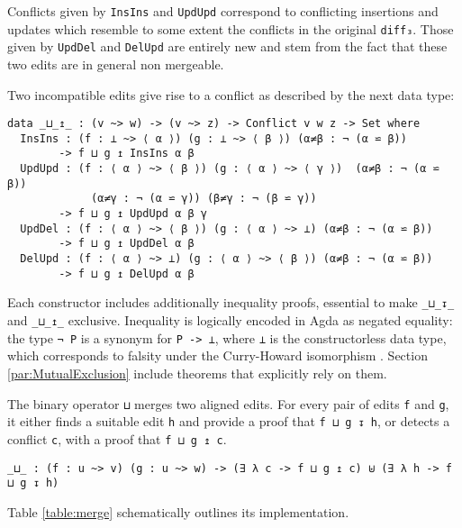 \documentclass[../Thesis.tex]{subfiles}
\begin{document}
	Conflicts given by \texttt{InsIns} and \texttt{UpdUpd}	 correspond to 
	conflicting insertions and updates which resemble to some extent the
	conflicts in the original \texttt{diff₃}. Those given by \texttt{UpdDel} and 
	\texttt{DelUpd} are entirely new and stem from the fact that these two
	edits are in general non mergeable.
	
	Two incompatible edits give rise to a conflict as described by the
	next data type:
	
\begin{verbatim}
data _⊔_↥_ : (v ~> w) -> (v ~> z) -> Conflict v w z -> Set where
  InsIns : (f : ⊥ ~> ⟨ α ⟩) (g : ⊥ ~> ⟨ β ⟩) (α≠β : ¬ (α ⋍ β)) 
        -> f ⊔ g ↥ InsIns α β
  UpdUpd : (f : ⟨ α ⟩ ~> ⟨ β ⟩) (g : ⟨ α ⟩ ~> ⟨ γ ⟩)  (α≠β : ¬ (α ⋍ β)) 
             (α≠γ : ¬ (α ⋍ γ)) (β≠γ : ¬ (β ⋍ γ)) 
        -> f ⊔ g ↥ UpdUpd α β γ
  UpdDel : (f : ⟨ α ⟩ ~> ⟨ β ⟩) (g : ⟨ α ⟩ ~> ⊥) (α≠β : ¬ (α ⋍ β)) 
        -> f ⊔ g ↥ UpdDel α β
  DelUpd : (f : ⟨ α ⟩ ~> ⊥) (g : ⟨ α ⟩ ~> ⟨ β ⟩) (α≠β : ¬ (α ⋍ β)) 
        -> f ⊔ g ↥ DelUpd α β
\end{verbatim}
	
	Each constructor includes additionally inequality proofs, essential 
	to make \texttt{\_⊔\_↧\_} and \texttt{\_⊔\_↥\_} exclusive.
	Inequality is logically encoded in Agda as negated equality: the type 
	\texttt{¬ P} is a synonym for \texttt{P -> ⊥}, where \texttt{⊥} is
	the constructorless data type, which corresponds to falsity 
	under the Curry-Howard isomorphism \cite{PropositionAsTypes}.
	Section \ref{par:MutualExclusion} include
	theorems that explicitly rely on them.

	The binary operator \texttt{⊔} merges two aligned edits.
	For every pair of edits \texttt{f} and \texttt{g}, 
	it either finds a suitable edit \texttt{h} and provide
	a proof that \texttt{f ⊔ g ↧ h}, or detects a conflict \texttt{c}, 
	with a proof that \texttt{f ⊔ g ↥ c}.

\begin{verbatim}
_⊔_ : (f : u ~> v) (g : u ~> w) -> (∃ λ c -> f ⊔ g ↥ c) ⊎ (∃ λ h -> f ⊔ g ↧ h)
\end{verbatim}

	Table \ref{table:merge} schematically outlines its implementation.
\end{document}
